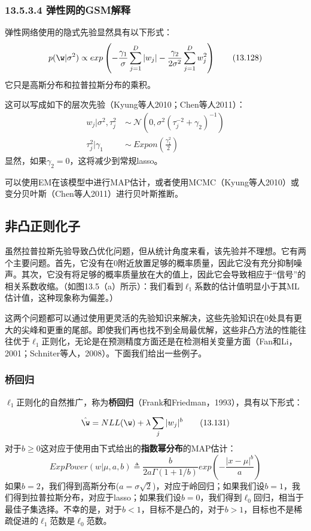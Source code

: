 \documentclass[a4paper]{article}
\begin{document}
\subsubsection*{13.5.3.4 弹性网的GSM解释}
弹性网络使用的隐式先验显然具有以下形式：
\begin{equation}
	p(\w|\sigma^2)\propto exp \left(-\frac{\gamma_1}{\sigma}\sum_{j=1}^{D}|w_j|-\frac{\gamma_2}{2\sigma^2}\sum_{j=1}^{D}w_j^2\right)\tag{13.128}
\end{equation}
它只是高斯分布和拉普拉斯分布的乘积。

这可以写成如下的层次先验（Kyung等人2010；Chen等人2011）：
\begin{align}
	w_j|\sigma^2,\tau_j^2\ &\sim\ \mathcal{N}(0,\sigma^2(\tau_j^{-2}+\gamma_2)^{-1})\tag{13.129}\\
	\tau_j^2|\gamma_1\ &\sim \ Expon(\frac{\gamma_1^2}{2})\tag{13.130}
\end{align}
显然，如果$\gamma_2=0$，这将减少到常规lasso。

可以使用EM在该模型中进行MAP估计，或者使用MCMC（Kyung等人2010）或变分贝叶斯（Chen等人2011）进行贝叶斯推断。

\subsection{非凸正则化子}
虽然拉普拉斯先验导致凸优化问题，但从统计角度来看，该先验并不理想。它有两个主要问题。首先，它没有在0附近放置足够的概率质量，因此它没有充分抑制噪声。其次，它没有将足够的概率质量放在大的值上，因此它会导致相应于“信号”的相关系数收缩。（如图13.5（a）所示）：我们看到$\ell_1$系数的估计值明显小于其ML估计值，这种现象称为偏差。）

这两个问题都可以通过使用更灵活的先验知识来解决，这些先验知识在0处具有更大的尖峰和更重的尾部。即使我们再也找不到全局最优解，这些非凸方法的性能往往优于$\ell_1$正则化，无论是在预测精度方面还是在检测相关变量方面（Fan和Li，2001；Schniter等人，2008）。下面我们给出一些例子。

\subsubsection{桥回归}
$\ell_1$正则化的自然推广，称为\textbf{桥回归}（Frank和Friedman，1993），具有以下形式：

\begin{equation}
	\hat{\w}=NLL(\w)+\lambda\sum_{j}|w_j|^b\tag{13.131}
\end{equation}
对于$b\ge 0$这对应于使用由下式给出的\textbf{指数幂分布}的MAP估计：
\begin{equation}
	ExpPower(w|\mu,a,b)\triangleq\dfrac{b}{2a\Gamma(1+1/b)}exp\left(-\dfrac{|x-\mu|^b}{a}\right)\tag{13.132}
\end{equation}
如果$b=2$，我们得到高斯分布($a=\sigma\sqrt{2}$)，对应于岭回归；如果我们设$b=1$，我们得到拉普拉斯分布，对应于lasso；如果我们设$b=0$，我们得到$\ell_0$回归，相当于最佳子集选择。不幸的是，对于$b<1$，目标不是凸的，对于$b>1$，目标也不是稀疏促进的$\ell_1$范数是$\ell_0$范数。
\end{document}
